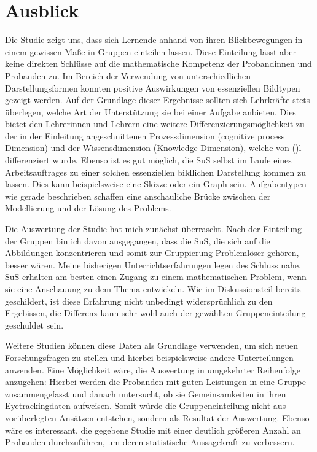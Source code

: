 \chapter{Ausblick}
Die Studie zeigt uns, dass sich Lernende anhand von ihren Blickbewegungen in einem gewissen Maße in Gruppen einteilen lassen. Diese Einteilung lässt aber keine direkten Schlüsse auf die mathematische Kompetenz der Probandinnen und Probanden zu.  Im Bereich der Verwendung von unterschiedlichen Darstellungsformen konnten positive Auswirkungen von essenziellen Bildtypen gezeigt werden.  Auf der Grundlage dieser Ergebnisse sollten sich Lehrkräfte stets überlegen, welche Art der Unterstützung sie bei einer Aufgabe anbieten. Dies bietet den Lehrerinnen und Lehrern eine weitere Differenzierungsmöglichkeit zu der in der Einleitung angeschnittenen Prozessdimension (cognitive process Dimension) und der Wissensdimension (Knowledge Dimension), welche von \citeauthor{anderson2001taxonomy} ()l differenziert wurde. Ebenso ist es gut möglich, die \gls{SuS} selbst im Laufe eines Arbeitsauftrages zu einer solchen essenziellen bildlichen Darstellung kommen zu lassen. Dies kann beispielsweise eine Skizze oder ein Graph sein. Aufgabentypen wie gerade beschrieben schaffen eine anschauliche Brücke zwischen der Modellierung und der Lösung des Problems.


Die Auswertung der Studie hat mich zunächst überrascht. Nach der Einteilung der Gruppen bin ich davon ausgegangen, dass die SuS, die sich auf die Abbildungen konzentrieren und somit zur Gruppierung Problemlöser gehören, besser wären. Meine bisherigen Unterrichtserfahrungen legen des Schluss nahe, SuS erhalten am besten einen Zugang zu einem mathematischen Problem, wenn sie eine Anschauung zu dem Thema entwickeln. Wie im Diskussionsteil bereits geschildert, ist diese Erfahrung nicht unbedingt widersprüchlich zu den Ergebissen, die Differenz kann sehr wohl auch der gewählten Gruppeneinteilung geschuldet sein. 


Weitere Studien können diese Daten als Grundlage verwenden, um sich neuen Forschungsfragen zu stellen und hierbei beispielsweise andere Unterteilungen anwenden. Eine Möglichkeit wäre, die Auswertung in umgekehrter Reihenfolge anzugehen: Hierbei werden die Probanden mit guten Leistungen in eine Gruppe zusammengefasst und danach untersucht, ob sie Gemeinsamkeiten in ihren Eyetrackingdaten aufweisen. Somit würde die Gruppeneinteilung nicht aus vorüberlegten Ansätzen entstehen, sondern als Resultat der Auswertung. 
Ebenso wäre es interessant, die gegebene Studie mit einer deutlich größeren Anzahl an Probanden durchzuführen, um deren statistische Aussagekraft zu verbessern.